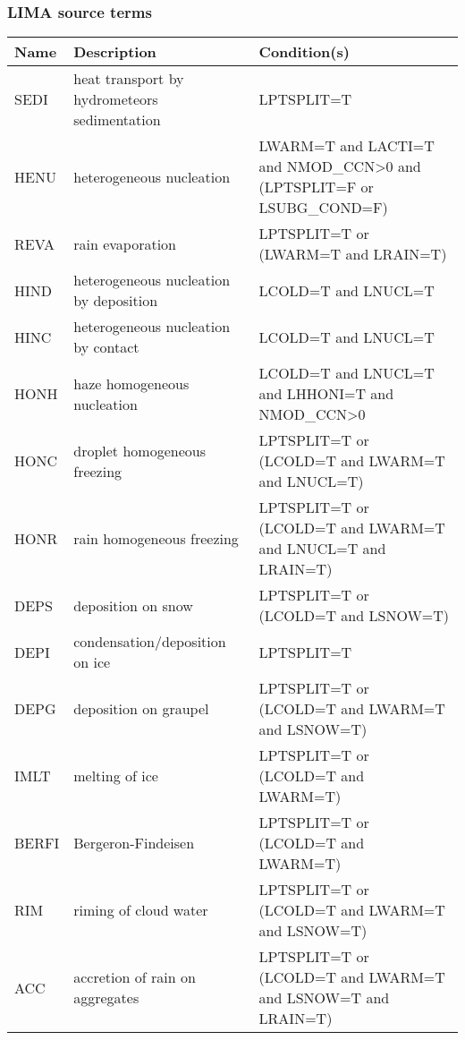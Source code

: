 \subsubsection{LIMA source terms}

\begin{longtable} {|p{}|p{}|p{}|}
\hline
Name & Description & Condition(s) \\
\hline \hline
\endhead
SEDI   & heat transport by hydrometeors sedimentation  & LPTSPLIT=T \\\hline
HENU   & heterogeneous nucleation                      & LWARM=T and LACTI=T and NMOD\_CCN>0 and (LPTSPLIT=F or LSUBG\_COND=F) \\\hline
REVA   & rain evaporation                              & LPTSPLIT=T or (LWARM=T and LRAIN=T) \\\hline
HIND   & heterogeneous nucleation by deposition        & LCOLD=T and LNUCL=T \\\hline
HINC   & heterogeneous nucleation by contact           & LCOLD=T and LNUCL=T \\\hline
HONH   & haze homogeneous nucleation                   & LCOLD=T and LNUCL=T and LHHONI=T and NMOD\_CCN>0 \\\hline
HONC   & droplet homogeneous freezing                  & LPTSPLIT=T or (LCOLD=T and LWARM=T and LNUCL=T) \\\hline
HONR   & rain homogeneous freezing                     & LPTSPLIT=T or (LCOLD=T and LWARM=T and LNUCL=T and LRAIN=T) \\\hline
DEPS   & deposition on snow                            & LPTSPLIT=T or (LCOLD=T and LSNOW=T) \\\hline
DEPI   & condensation/deposition on ice                & LPTSPLIT=T \\\hline
DEPG   & deposition on graupel                         & LPTSPLIT=T or (LCOLD=T and LWARM=T and LSNOW=T) \\\hline
IMLT   & melting of ice                                & LPTSPLIT=T or (LCOLD=T and LWARM=T) \\\hline
BERFI  & Bergeron-Findeisen                            & LPTSPLIT=T or (LCOLD=T and LWARM=T) \\\hline
RIM    & riming of cloud water                         & LPTSPLIT=T or (LCOLD=T and LWARM=T and LSNOW=T) \\\hline
ACC    & accretion of rain on aggregates               & LPTSPLIT=T or (LCOLD=T and LWARM=T and LSNOW=T and LRAIN=T) \\\hline

\end{longtable}
